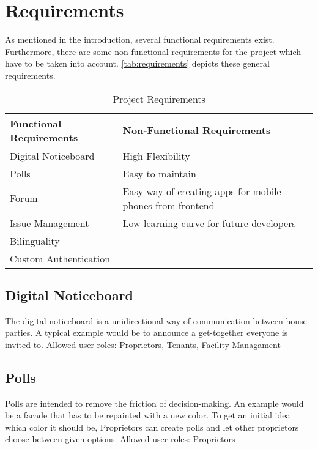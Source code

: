 \section{Requirements}
As mentioned in the introduction, several functional requirements exist. Furthermore, there are some non-functional requirements for the project which have to be taken into account. \autoref{tab:requirements} depicts these general requirements. \newline

\begin{table}[H]
    \begin{center}
      \begin{tabular}{l|l} %
        \textbf{Functional Requirements} & \textbf{Non-Functional Requirements}\\
        \hline
        Digital Noticeboard & High Flexibility \\
        Polls & Easy to maintain\\
        Forum & Easy way of creating apps for mobile phones from frontend\\
        Issue Management & Low learning curve for future developers\\
        Bilinguality & \\
        Custom Authentication & \\
      \end{tabular}
      \caption{Project Requirements}
      \label{tab:requirements}
    \end{center}
  \end{table}

  
\subsection{Digital Noticeboard}
The digital noticeboard is a unidirectional way of communication between house parties. A typical example would be to announce a get-together everyone is invited to. \newline
Allowed user roles: Proprietors, Tenants, Facility Managament

\subsection{Polls}
Polls are intended to remove the friction of decision-making. An example would be a facade that has to be repainted with a new color. To get an initial idea which color it should be, Proprietors can create polls and let other proprietors choose between given options. \newline
Allowed user roles: Proprietors

